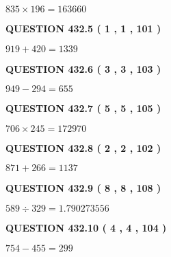 \documentclass{ctexart}
\begin{document}
  
 
 

$ %
835 \times  %
196=   %
163660$
 
 
  
\vspace{0.2in}
  
{\textbf{\Large{QUESTION
432.5 
 ( 1 , 1 , 101 )
}}}
  
  
 
 

$ %
919 +  %
420=   %
1339$
 
 
  
\vspace{0.2in}
  
{\textbf{\Large{QUESTION
432.6 
 ( 3 , 3 , 103 )
}}}
  
  
 
 

$ %
949 -  %
294=   %
655$
 
 
  
\vspace{0.2in}
  
{\textbf{\Large{QUESTION
432.7 
 ( 5 , 5 , 105 )
}}}
  
  
 
 

$ %
706 \times  %
245=   %
172970$
 
 
  
\vspace{0.2in}
  
{\textbf{\Large{QUESTION
432.8 
 ( 2 , 2 , 102 )
}}}
  
  
 
 

$ %
871 +  %
266=   %
1137$
 
 
  
\vspace{0.2in}
  
{\textbf{\Large{QUESTION
432.9 
 ( 8 , 8 , 108 )
}}}
  
  
 
 

$ %
589 \div  %
329=   %
1.790273556$
 
 
  
\vspace{0.2in}
  
{\textbf{\Large{QUESTION
432.10 
 ( 4 , 4 , 104 )
}}}
  
  
 
 

$ %
754 -  %
455=   %
299$
 
 
   
\end{document}
